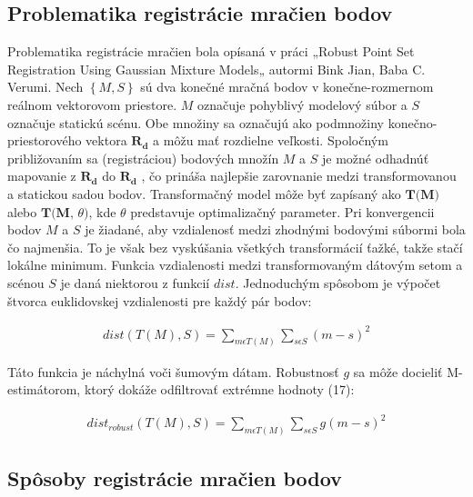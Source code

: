 \subsection{Problematika registrácie mračien bodov}

Problematika registrácie mračien bola opísaná v práci „Robust Point Set Registration Using Gaussian Mixture Models„ autormi Bink Jian, Baba C. Verumi. Nech $\left\lbrace M, S \right\rbrace $ sú dva konečné mračná bodov v konečne-rozmernom reálnom vektorovom priestore. $M$ označuje pohyblivý modelový súbor a $S$ označuje statickú scénu. Obe množiny sa označujú ako podmnožiny konečno-priestorového vektora $\textbf{R}_{\textbf{d}}$ a môžu mať rozdielne veľkosti. Spoločným približovaním sa (registráciou) bodových množín $M$ a $S$ je možné odhadnúť mapovanie z $\textbf{R}_\textbf{d}$ do $\textbf{R}_\textbf{d}$ , čo prináša najlepšie zarovnanie medzi transformovanou a statickou sadou bodov. Transformačný model môže byť zapísaný ako $\textbf{T(M)}$ alebo $\textbf{T(M, $\theta$)}$, kde $\theta$ predstavuje optimalizačný parameter. Pri konvergencii bodov $M$ a $S$ je žiadané, aby vzdialenosť medzi zhodnými bodovými súbormi bola čo najmenšia. To je však bez vyskúšania všetkých transformácií ťažké, takže stačí lokálne minimum. Funkcia vzdialenosti medzi transformovaným dátovým setom a scénou $S$ je daná niektorou z funkcií $dist$. Jednoduchým spôsobom je výpočet štvorca euklidovskej vzdialenosti pre každý pár bodov:

\begin{equation}
\label{eq8}
\begin{aligned}
dist\left(T\left(M\right),S\right)=\sum_{m\epsilon T\left(M\right)} \sum_{s\epsilon S} \left(m-s\right)^2
\end{aligned}
\end{equation}

Táto funkcia je náchylná voči šumovým dátam. Robustnosť $g$ sa môže docieliť M-estimátorom, ktorý dokáže odfiltrovať extrémne hodnoty (17):

\begin{equation}
\label{eq9}
\begin{aligned}
dist_{robust}\left(T\left(M\right),S\right)=\sum_{m\epsilon T\left(M\right)} \sum_{s\epsilon S} g\left(m-s\right)^2
\end{aligned}
\end{equation}

\subsection{Spôsoby registrácie mračien bodov}

